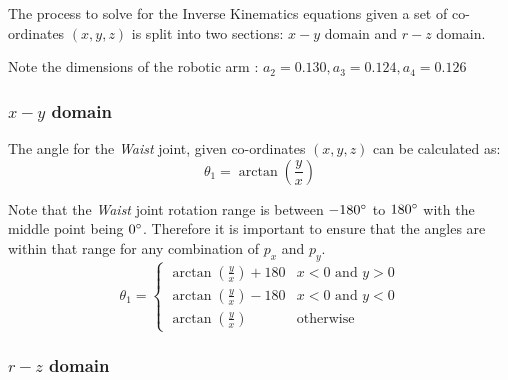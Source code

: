 \documentclass[9pt, a4paper]{article}
\begin{document}
The process to solve for the Inverse Kinematics equations given a set of
co-ordinates $(x,y,z)$ is split into two sections: $x-y$ domain and $r-z$
domain.

Note the dimensions of the robotic arm \cite{CAD_model}: $a_2 = 0.130, a_3 = 0.124, a_4 = 0.126$


\subsubsection{$x-y$ domain}
The angle for the \textit{Waist} joint, given co-ordinates $(x, y, z)$ can be calculated as:
$$
  \theta_1 = \arctan \left(\frac{y}{x}\right)
$$

Note that the \textit{Waist} joint rotation range is between $-180\degree$ to
$180\degree$ with the middle point being $0\degree$. Therefore it is important
to ensure that the angles are within that range for any combination of $p_x$ and
$p_y$.
$$
\theta_1 = \begin{cases} 
  \arctan(\frac{y}{x}) + 180 & x < 0 \text{ and } y > 0 \\ 
  \arctan(\frac{y}{x}) - 180 & x < 0 \text{ and } y < 0 \\
  \arctan(\frac{y}{x}) & \text{otherwise}
\end{cases}
$$

\subsubsection{$r-z$ domain}
\end{document}
